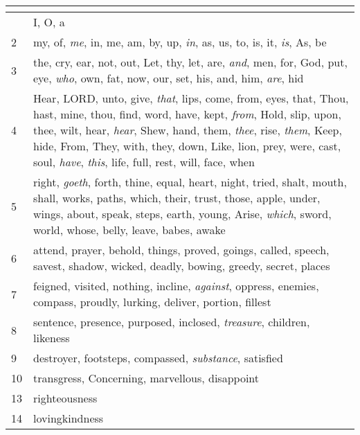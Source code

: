 \begin{center}
\begin{longtable}{l|p{3.75in}}
\hline \multicolumn{2}{c}{{ }} \\ \hline
\endfoot 
1 & I, O, a\\ \hline 
2 & my, of, \emph{me}, in, me, am, by, up, \emph{in}, as, us, to, is, it, \emph{is}, As, be\\ \hline 
3 & the, cry, ear, not, out, Let, thy, let, are, \emph{and}, men, for, God, put, eye, \emph{who}, own, fat, now, our, set, his, and, him, \emph{are}, hid\\ \hline 
4 & Hear, LORD, unto, give, \emph{that}, lips, come, from, eyes, that, Thou, hast, mine, thou, find, word, have, kept, \emph{from}, Hold, slip, upon, thee, wilt, hear, \emph{hear}, Shew, hand, them, \emph{thee}, rise, \emph{them}, Keep, hide, From, They, with, they, down, Like, lion, prey, were, cast, soul, \emph{have}, \emph{this}, life, full, rest, will, face, when\\ \hline 
5 & right, \emph{goeth}, forth, thine, equal, heart, night, tried, shalt, mouth, shall, works, paths, which, their, trust, those, apple, under, wings, about, speak, steps, earth, young, Arise, \emph{which}, sword, world, whose, belly, leave, babes, awake\\ \hline 
6 & attend, prayer, behold, things, proved, goings, called, speech, savest, shadow, wicked, deadly, bowing, greedy, secret, places\\ \hline 
7 & feigned, visited, nothing, incline, \emph{against}, oppress, enemies, compass, proudly, lurking, deliver, portion, fillest\\ \hline 
8 & sentence, presence, purposed, inclosed, \emph{treasure}, children, likeness\\ \hline 
9 & destroyer, footsteps, compassed, \emph{substance}, satisfied\\ \hline 
10 & transgress, Concerning, marvellous, disappoint\\ \hline 
13 & righteousness\\ \hline 
14 & lovingkindness\\ \hline 
\end{longtable}
\end{center}





